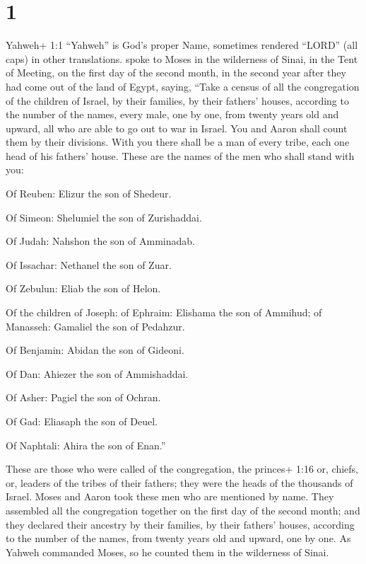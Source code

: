 \hypertarget{section}{%
\section{1}\label{section}}

 Yahweh+ 1:1 ``Yahweh'' is God's proper Name, sometimes
rendered ``LORD'' (all caps) in other translations. spoke to Moses in
the wilderness of Sinai, in the Tent of Meeting, on the first day of the
second month, in the second year after they had come out of the land of
Egypt, saying,  ``Take a census of all the congregation of
the children of Israel, by their families, by their fathers' houses,
according to the number of the names, every male, one by one,
 from twenty years old and upward, all who are able to go
out to war in Israel. You and Aaron shall count them by their divisions.
 With you there shall be a man of every tribe, each one head
of his fathers' house.  These are the names of the men who
shall stand with you:

Of Reuben: Elizur the son of Shedeur.

 Of Simeon: Shelumiel the son of Zurishaddai.

 Of Judah: Nahshon the son of Amminadab.

 Of Issachar: Nethanel the son of Zuar.

 Of Zebulun: Eliab the son of Helon.

 Of the children of Joseph: of Ephraim: Elishama the son of
Ammihud; of Manasseh: Gamaliel the son of Pedahzur.

 Of Benjamin: Abidan the son of Gideoni.

 Of Dan: Ahiezer the son of Ammishaddai.

 Of Asher: Pagiel the son of Ochran.

 Of Gad: Eliasaph the son of Deuel.

 Of Naphtali: Ahira the son of Enan.''

 These are those who were called of the congregation, the
princes+ 1:16 or, chiefs, or, leaders of the tribes of their fathers;
they were the heads of the thousands of Israel.  Moses and
Aaron took these men who are mentioned by name.  They
assembled all the congregation together on the first day of the second
month; and they declared their ancestry by their families, by their
fathers' houses, according to the number of the names, from twenty years
old and upward, one by one.  As Yahweh commanded Moses, so
he counted them in the wilderness of Sinai.


